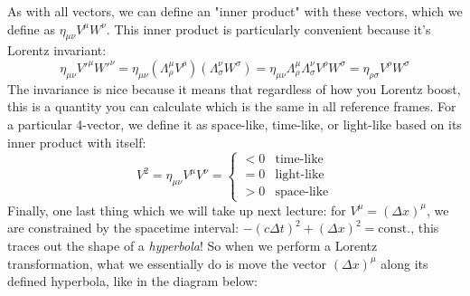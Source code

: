 As with all vectors, we can define an "inner product" with these vectors, which we define as \( \eta_{\mu
\nu} V^{\mu} W^{\nu} \). This inner product is particularly convenient because it's Lorentz invariant:
\[
	\eta_{\mu \nu}V'^{\mu}W'^{\nu} = \eta_{\mu \nu}\left( \Lambda^{\mu}_\rho V^{\rho} \right)\left(
	\Lambda^{\nu}_\sigma W^{\sigma} \right) = \eta_{\mu \nu} \Lambda^{\mu}_\rho \Lambda^{\nu}_\sigma V^{\rho}
	W^{\sigma} = \eta_{\rho \sigma} V^{\rho}W^{\sigma}
\]
The invariance is nice because it means that regardless of how you Lorentz boost, this is a quantity you can
calculate which is the same in all reference frames. For a particular 4-vector, we define it as space-like,
time-like, or light-like based on its inner product with itself:
\[
	V^2 = \eta_{\mu \nu}V^{\mu}V^{\nu} = \begin{cases}
		< 0 & \text{time-like}\\
		= 0 & \text{light-like} \\ 
		> 0 & \text{space-like}
	\end{cases}
\]
Finally, one last thing which we will take up next lecture: for \( V^{\mu} = (\Delta x)^{\mu} \), we are
constrained by the spacetime interval: \( -(c \Delta t)^2 + (\Delta x)^2 = \text{const.} \), this traces out
the shape of a \textit{hyperbola}! So when we perform a Lorentz transformation, what we essentially do is
move the vector \( (\Delta x)^{\mu} \) along its defined hyperbola, like in the diagram below: 

\begin{center}
\end{center}










